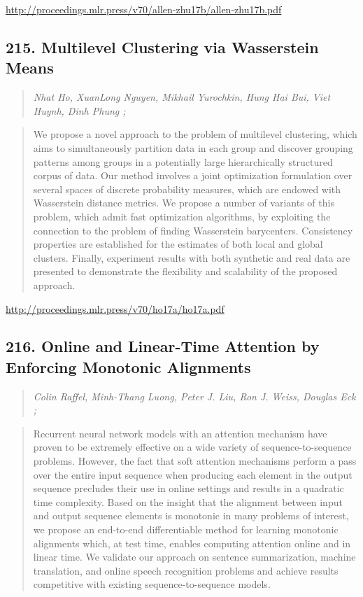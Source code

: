 \documentclass{article}
\begin{document}
\href{http://proceedings.mlr.press/v70/allen-zhu17b/allen-zhu17b.pdf}{http://proceedings.mlr.press/v70/allen-zhu17b/allen-zhu17b.pdf}

\subsection{215. Multilevel Clustering via Wasserstein Means}

\begin{quote}
\footnotesize{\textit{Nhat Ho, XuanLong Nguyen, Mikhail Yurochkin, Hung Hai Bui, Viet Huynh, Dinh Phung ;}}
\end{quote}

\begin{quote}
    We propose a novel approach to the problem of multilevel clustering, which aims to simultaneously partition data in each group and discover grouping patterns among groups in a potentially large hierarchically structured corpus of data. Our method involves a joint optimization formulation over several spaces of discrete probability measures, which are endowed with Wasserstein distance metrics. We propose a number of variants of this problem, which admit fast optimization algorithms, by exploiting the connection to the problem of finding Wasserstein barycenters. Consistency properties are established for the estimates of both local and global clusters. Finally, experiment results with both synthetic and real data are presented to demonstrate the flexibility and scalability of the proposed approach.  \end{quote}

\href{http://proceedings.mlr.press/v70/ho17a/ho17a.pdf}{http://proceedings.mlr.press/v70/ho17a/ho17a.pdf}

\subsection{216. Online and Linear-Time Attention by Enforcing Monotonic Alignments}

\begin{quote}
\footnotesize{\textit{Colin Raffel, Minh-Thang Luong, Peter J. Liu, Ron J. Weiss, Douglas Eck ;}}
\end{quote}

\begin{quote}
    Recurrent neural network models with an attention mechanism have proven to be extremely effective on a wide variety of sequence-to-sequence problems. However, the fact that soft attention mechanisms perform a pass over the entire input sequence when producing each element in the output sequence precludes their use in online settings and results in a quadratic time complexity. Based on the insight that the alignment between input and output sequence elements is monotonic in many problems of interest, we propose an end-to-end differentiable method for learning monotonic alignments which, at test time, enables computing attention online and in linear time. We validate our approach on sentence summarization, machine translation, and online speech recognition problems and achieve results competitive with existing sequence-to-sequence models.  \end{quote}
\end{document}
